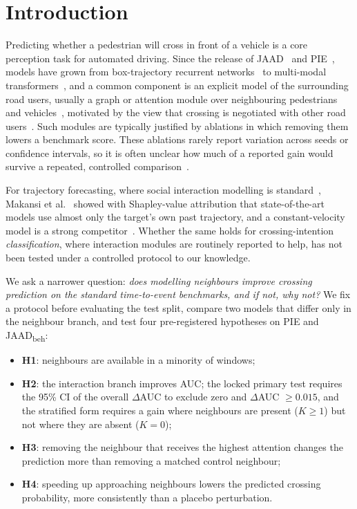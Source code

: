 \documentclass[conference]{IEEEtran}
\newcommand{\dauc}{$\Delta$AUC}
\begin{document}
\section{Introduction}
Predicting whether a pedestrian will cross in front of a vehicle is a core perception task for automated driving. Since the release of JAAD~\cite{rasouli2017jaad} and PIE~\cite{rasouli2019pie}, models have grown from box-trajectory recurrent networks~\cite{rasouli2019sfgru} to multi-modal transformers~\cite{kotseruba2021benchmark}, and a common component is an explicit model of the surrounding road users, usually a graph or attention module over neighbouring pedestrians and vehicles~\cite{liu2020strr,yau2021graphsim,zhai2022social}, motivated by the view that crossing is negotiated with other road users~\cite{rasouli2020survey}. Such modules are typically justified by ablations in which removing them lowers a benchmark score. These ablations rarely report variation across seeds or confidence intervals, so it is often unclear how much of a reported gain would survive a repeated, controlled comparison~\cite{bouthillier2021variance,dodge2019showyourwork,henderson2018matters}.

For trajectory forecasting, where social interaction modelling is standard~\cite{alahi2016sociallstm,gupta2018socialgan,salzmann2020trajectron,kothari2022trajnet}, Makansi et al.~\cite{makansi2022walkalone} showed with Shapley-value attribution that state-of-the-art models use almost only the target's own past trajectory, and a constant-velocity model is a strong competitor~\cite{schoeller2020cvm}. Whether the same holds for crossing-intention \emph{classification}, where interaction modules are routinely reported to help, has not been tested under a controlled protocol to our knowledge.

We ask a narrower question: \emph{does modelling neighbours improve crossing prediction on the standard time-to-event benchmarks, and if not, why not?} We fix a protocol before evaluating the test split, compare two models that differ only in the neighbour branch, and test four pre-registered hypotheses on PIE and JAAD\textsubscript{beh}:
\begin{itemize}
  \item \textbf{H1}: neighbours are available in a minority of windows;
  \item \textbf{H2}: the interaction branch improves AUC; the locked primary test requires the 95\% CI of the overall \dauc{} to exclude zero and \dauc{} $\ge 0.015$, and the stratified form requires a gain where neighbours are present ($K\ge1$) but not where they are absent ($K=0$);
  \item \textbf{H3}: removing the neighbour that receives the highest attention changes the prediction more than removing a matched control neighbour;
  \item \textbf{H4}: speeding up approaching neighbours lowers the predicted crossing probability, more consistently than a placebo perturbation.
\end{itemize}
\end{document}
